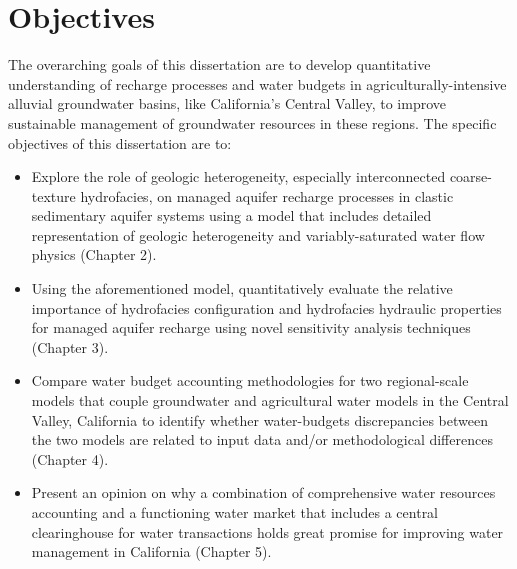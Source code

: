 \section{Objectives}

The overarching goals of this dissertation are to develop quantitative understanding of recharge processes and water budgets in agriculturally-intensive alluvial groundwater basins, like California's Central Valley, to improve sustainable management of groundwater resources in these regions. The specific objectives of this dissertation are to:

\begin{itemize}
    \item Explore the role of geologic heterogeneity, especially interconnected coarse-texture hydrofacies, on managed aquifer recharge processes in clastic sedimentary aquifer systems using a model that includes detailed representation of geologic heterogeneity and variably-saturated water flow physics (Chapter 2).
    
    \item Using the aforementioned model, quantitatively evaluate the relative importance of hydrofacies configuration and hydrofacies hydraulic properties for managed aquifer recharge using novel sensitivity analysis techniques (Chapter 3).
    
    \item Compare water budget accounting methodologies for two regional-scale models that couple groundwater and agricultural water models in the Central Valley, California to identify whether water-budgets discrepancies between the two models are related to input data and/or methodological differences (Chapter 4).
    
    \item Present an opinion on why a combination of comprehensive water resources accounting and a functioning water market that includes a central clearinghouse for water transactions holds great promise for improving water management in California (Chapter 5).
    
\end{itemize}